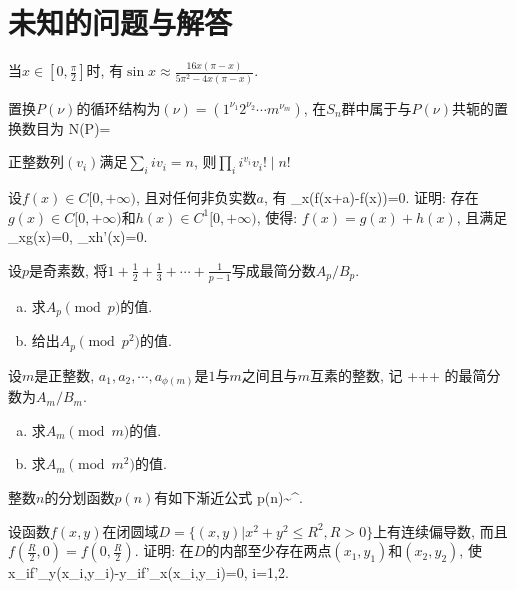 \chapter{未知的问题与解答}

当$x\in \left[0,\frac{\pi}{2}\right]$时, 有$\sin x\approx\frac{16x(\pi-x)}{5\pi^2-4x(\pi-x)}$.
\eu


\eu


\eu

\bu{}{}
置换$P(\nu)$的循环结构为$(\nu)=(1^{\nu_1}2^{\nu_2}\cdots m^{\nu_m})$, 在$S_n$群中属于与$P(\nu)$共轭的置换数目为
\bee
N(P)=
\eee
\eu

\bu{}{}
正整数列$(v_i)$满足$\sum_iiv_i=n$, 则$\prod_ii^{v_i}v_i!\mid n!$
\eu

\bu{}{}
设$f(x)\in C[0,+\infty)$, 且对任何非负实数$a$, 有
\bee
\lim_{x\to\infty}(f(x+a)-f(x))=0.
\eee
证明: 存在$g(x)\in C[0,+\infty)$和$h(x)\in C^1[0,+\infty)$, 使得: $f(x)=g(x)+h(x)$, 且满足
\bee
\lim_{x\to\infty}g(x)=0, \quad \lim_{x\to\infty}h'(x)=0.
\eee
\eu

\bu{}{}
设$p$是奇素数, 将$1+\frac12+\frac13+\cdots+\frac1{p-1}$写成最简分数$A_p/B_p$.
\begin{enumerate}[(a)]
 \item 求$A_p\pmod{p}$的值.
 \item 给出$A_p\pmod{p^2}$的值.
\end{enumerate}
\eu

\bu{}{}
设$m$是正整数, $a_1, a_2,\cdots, a_{\phi(m)}$是$1$与$m$之间且与$m$互素的整数,
记
\bee
{}++\cdots+
\eee
的最简分数为$A_m/B_m$.
\begin{enumerate}[(a)]
 \item 求$A_m\pmod{m}$的值.
 \item 求$A_m\pmod{m^2}$的值.
\end{enumerate}
\eu

整数$n$的分划函数$p(n)$有如下渐近公式
\bee
p(n)\sim{}\ue^{\pi{}}.
\eee
\eu


\eu


\eu

设函数$f(x,y)$在闭圆域$D=\{(x,y)\vert x^2+y^2\le R^2, R>0\}$上有连续偏导数, 
而且$f\left(\frac{R}{2},0\right)=f\left(0,\frac{R}{2}\right)$. 证明: 在$D$的内部至少存在两点$(x_1, y_1)$和$(x_2, y_2)$, 
使
\bee
x_if'_y(x_i,y_i)-y_if'_x(x_i,y_i)=0, i=1,2.
\eee
\eu

